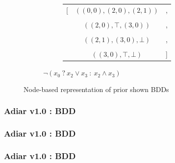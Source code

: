 \documentclass[english, aspectratio=169]{beamer}
\begin{document}
\begin{frame}
\begin{figure}
\begin{subfigure}{0.49\linewidth}
      \begin{subfigure}[b]{0.33\linewidth}
        \centering
        \begin{tikzpicture}[scale=0.6, every node/.style={transform shape}]
          
        \end{tikzpicture}
      \end{subfigure}
      \begin{subfigure}[b]{0.55\linewidth}
        \centering
        { \tiny
          \begin{tabular}{r c l}
            [ & $((0,0), (2,0), (2,1))$ & ,
            \\ \\
              & $((2,0), \top, (3,0))$ & ,
            \\ \\
              & $((2,1), (3,0), \bot)$   & ,
            \\ \\
              & $((3,0), \top, \bot)$   & ]
          \end{tabular}
          \vspace{10pt}
        }
      \end{subfigure}

      \caption{$\neg (x_0 \ ?\ x_2 \vee x_3 \ :\ x_2 \wedge x_3)$}
    \end{subfigure}

    \caption{Node-based representation of prior shown BDDs}
  \end{figure}

\end{frame}

\begin{frame}
  \frametitle{Adiar v1.0 : BDD}


  
\end{frame}

\begin{frame}
  \frametitle{Adiar v1.0 : BDD}

  
\end{frame}

\begin{frame}
  \frametitle{Adiar v1.0 : BDD}

  
\end{frame}

\end{document}
